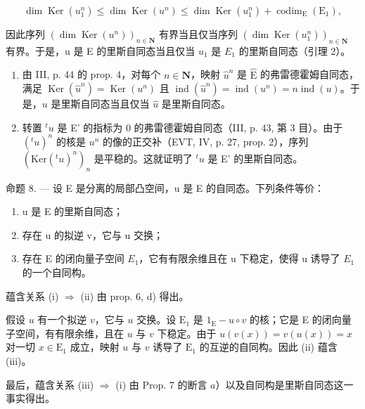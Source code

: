 \[
\dim \operatorname{Ker} (u _ {1} ^ {n}) \leqslant \dim \operatorname{Ker} (u ^ {n}) \leqslant \dim \operatorname{Ker} (u _ {1} ^ {n}) + \operatorname{codim} _ {\mathrm{E}} (\mathrm{E} _ {1}),
\]

因此序列 \((\dim\operatorname{Ker}(u^{n}))_{n\in\mathbf{N}}\) 有界当且仅当序列 \((\dim\operatorname{Ker}(u_{1}^{n}))_{n\in\mathbf{N}}\) 有界。于是，u 是 E 的里斯自同态当且仅当 \(u_{1}\) 是 \(E_{1}\) 的里斯自同态（引理 2）。

\begin{enumerate}
\def\labelenumi{\alph{enumi})}
\setcounter{enumi}{1}
\item
  由 III, p. 44 的 prop. 4，对每个 \(n \in \mathbf{N}\)，映射 \(\widehat{u}^n\) 是 \(\widehat{\mathrm{E}}\) 的弗雷德霍姆自同态，满足 \(\operatorname{Ker}(\widehat{u}^n) = \operatorname{Ker}(u^n)\) 且 \(\operatorname{ind}(\widehat{u}^n) = \operatorname{ind}(u^n) = n\operatorname{ind}(u)\)。于是，\(u\) 是里斯自同态当且仅当 \(\widehat{u}\) 是里斯自同态。
\item
  转置 \({}^{t}u\) 是 E' 的指标为 0 的弗雷德霍姆自同态（III, p. 43, 第 3 目）。由于 \((^{t}u)^{n}\) 的核是 \(u^{n}\) 的像的正交补（EVT, IV, p. 27, prop. 2），序列 \((\mathrm{Ker}({}^{t}u)^{n})_{n}\) 是平稳的。这就证明了 \({}^{t}u\) 是 E' 的里斯自同态。
\end{enumerate}

命题 8. --- 设 E 是分离的局部凸空间，u 是 E 的自同态。下列条件等价：

\begin{enumerate}
\def\labelenumi{(\roman{enumi})}
\item
  u 是 E 的里斯自同态；
\item
  存在 u 的拟逆 v，它与 u 交换；
\item
  存在 E 的闭向量子空间 \(E_{1}\)，它有有限余维且在 u 下稳定，使得 u 诱导了 \(E_{1}\) 的一个自同构。
\end{enumerate}

蕴含关系 (i) \(\Longrightarrow\) (ii) 由 prop. 6, d) 得出。

假设 \(u\) 有一个拟逆 \(v\)，它与 \(u\) 交换。设 \(\mathrm{E}_1\) 是 \(1_{\mathrm{E}} - u \circ v\) 的核；它是 E 的闭向量子空间，有有限余维，且在 \(u\) 与 \(v\) 下稳定。由于 \(u(v(x)) = v(u(x)) = x\) 对一切 \(x \in \mathrm{E}_1\) 成立，映射 \(u\) 与 \(v\) 诱导了 \(\mathrm{E}_1\) 的互逆的自同构。因此 (ii) 蕴含 (iii)。

最后，蕴含关系 (iii) \(\Longrightarrow\) (i) 由 Prop. 7 的断言 \(a\)）以及自同构是里斯自同态这一事实得出。

